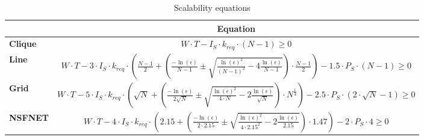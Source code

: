 \begin{table}[]
\centering
\begin{tabular}{l|l|}
\cline{2-2}
                             & \multicolumn{1}{c|}{{\bf Equation}} \\ \hline
\multicolumn{1}{|l|}{\textbf{Clique}} & \multicolumn{1}{c|}{$W \cdot T - I_S \cdot k_{req} \cdot (N-1) \geq 0$}            \\ \hline
\multicolumn{1}{|l|}{\textbf{Line}}   & \multicolumn{1}{c|}{$W \cdot T - 3 \cdot I_S \cdot k_{req} \cdot (\frac{N-1}{2} + (\frac{-\ln(\epsilon)}{N-1} \pm \sqrt{\frac{\ln(\epsilon)^2}{(N-1)^2} - 4\frac{\ln(\epsilon)}{N-1}} ) \cdot \frac{N-1}{2}) - 1.5 \cdot P_S \cdot (N-1) \geq 0$}       \\ \hline
\multicolumn{1}{|l|}{\textbf{Grid}}   & \multicolumn{1}{c|}{$W \cdot T - 5 \cdot I_S \cdot k_{req} \cdot ( \sqrt{N} + (\frac{-\ln(\epsilon)}{2\sqrt{N}} \pm \sqrt{\frac{\ln(\epsilon)^2}{4 \cdot N} - 2\frac{\ln(\epsilon)}{\sqrt{N}}} ) \cdot N^{\frac{1}{4}}) - 2.5 \cdot P_S \cdot (2 \cdot \sqrt{N} - 1) \geq 0$}      \\ \hline
\multicolumn{1}{|l|}{\textbf{NSFNET}}   & \multicolumn{1}{c|}{$W \cdot T - 4 \cdot I_S \cdot k_{req} \cdot ( 2.15 + (\frac{-\ln(\epsilon)}{2 \cdot 2.15} \pm \sqrt{\frac{\ln(\epsilon)^2}{4 \cdot 2.15^2} - 2\frac{\ln(\epsilon)}{2.15}} ) \cdot 1.47) - 2 \cdot P_S \cdot 4 \geq 0$}      \\ \hline
\end{tabular}
\vspace{1mm}
\caption{Scalability equations}
\label{table:scal_eqs}
\end{table}

